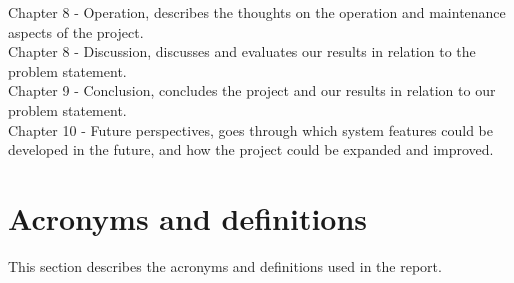 \documentclass[
]{article}
\begin{document}
Chapter 8 - Operation, describes the thoughts on the operation and
maintenance aspects of the project. ~\\

Chapter 8 - Discussion, discusses and evaluates our results in relation
to the problem statement. ~\\

Chapter 9 - Conclusion, concludes the project and our results in
relation to our problem statement. ~\\

Chapter 10 - Future perspectives, goes through which system features
could be developed in the future, and how the project could be expanded
and improved.

\newpage{}

\hypertarget{acronyms-and-definitions}{%
\section{Acronyms and definitions}\label{acronyms-and-definitions}}

This section describes the acronyms and definitions used in the report.
\end{document}
